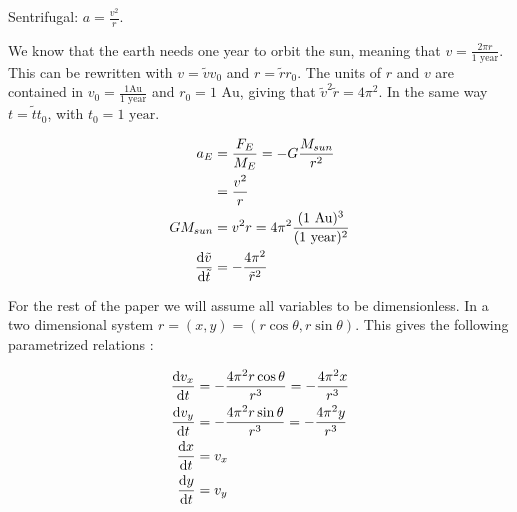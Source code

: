 
Sentrifugal: $ a = \frac{v^2}{r} $. 

We know that the earth needs one year to orbit the sun, meaning that $ v = \frac{2\pi r}{\text{1 year}} $. This can be rewritten with $ v = \tilde{v}v_0 $ and $ r = \tilde{r}r_0 $. The units of $ r $ and $ v $ are contained in  $ v_0 = \frac{1 \text{Au}}{1 \text{ year}} $ and $ r_0=1\text{ Au} $, giving that $ \tilde{v}^2\tilde{r} = 4\pi^2 $. In the same way $ t = \tilde{t}t_0 $, with $ t_0 = 1 \text{ year} $. 


\begin{align}
	a_E &= \frac{F_E}{M_E}= - G\frac{M_{sun}}{r^2}\\
	&= \frac{v^2}{r}\\
	GM_{sun}&= v^2 r = 4\pi^2 \frac{(\text{1 Au})^3}{(\text{1 year})^2}\\
	\dv{\tilde{v}}{\tilde{t}} &=- \frac{4\pi^2}{\tilde{r}^2} \label{eq:}
\end{align}

For the rest of the paper we will assume all variables to be dimensionless. 
In a two dimensional system $ r = (x,y) = (r\cos\theta, r\sin\theta) $. This gives the following parametrized relations :

\begin{align}
	\dv{{v}_x}{{t}} &=- \frac{4\pi^2r\cos\theta}{{r}^3}  =- \frac{4\pi^2x}{{r}^3} \\
		\dv{{v}_y}{{t}} &=- \frac{4\pi^2r\sin\theta}{{r}^3}  = -\frac{4\pi^2y}{{r}^3}\\
		\dv{x}{t} &= v_x\\
				\dv{y}{t} &= v_y\\
\end{align}